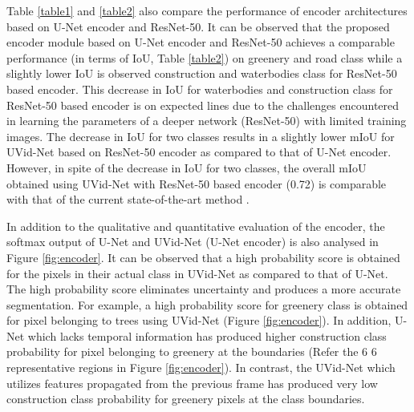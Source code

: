 \documentclass[journal]{IEEEtran}
\begin{document}
Table \ref{table1} and \ref{table2} also compare the performance of encoder architectures based on U-Net encoder and ResNet-50. It can be observed that the proposed encoder module based on U-Net encoder and ResNet-50 achieves a comparable performance (in terms of IoU, Table \ref{table2}) on greenery and road class while a slightly lower IoU is observed construction and waterbodies class for ResNet-50 based encoder. This decrease in IoU for waterbodies and construction class for ResNet-50 based encoder is on expected lines due to the challenges encountered in learning the parameters of a deeper network (ResNet-50) with limited training images. The decrease in IoU for two classes results in a slightly lower mIoU for UVid-Net based on ResNet-50 encoder as compared to that of U-Net encoder. However, in spite of the decrease in IoU for two classes, the overall mIoU obtained using UVid-Net with ResNet-50 based encoder (0.72) is comparable with that of the current state-of-the-art method \cite{22}.

In addition to the qualitative and quantitative evaluation of the encoder, the softmax output of U-Net and UVid-Net (U-Net encoder) is also analysed in Figure \ref{fig:encoder}. It can be observed that a high probability score is obtained for the pixels in their actual class in UVid-Net as compared to that of U-Net. The high probability score eliminates uncertainty and produces a more accurate segmentation. For example, a high probability score for greenery class is obtained for pixel belonging to trees using UVid-Net (Figure \ref{fig:encoder}). In addition, U-Net which lacks temporal information has produced higher construction class probability for pixel belonging to greenery at the boundaries (Refer the 6  6 representative regions in Figure \ref{fig:encoder}). In contrast, the UVid-Net which utilizes features propagated from the previous frame has produced very low construction class probability for greenery pixels at the class boundaries. 
\end{document}
